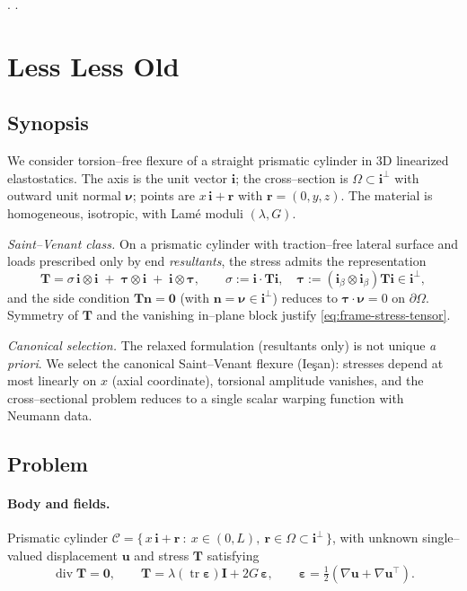 \cite{iesan1987saintvenants}.  \cite{synge1945problem}. 



\section{Less Less Old}

\subsection*{Synopsis}

We consider torsion–free flexure of a straight prismatic cylinder in 3D linearized elastostatics. The axis is the unit vector $\mathbf{i}$; the cross–section is $\Omega\subset \mathbf{i}^\perp$ with outward unit normal $\bm{\nu}$; points are $x\,\mathbf{i}+\bm{r}$ with $\bm{r}=(0,y,z)$. 
The material is homogeneous, isotropic, with Lamé moduli $(\lambda,G)$.

\emph{Saint–Venant class.} On a prismatic cylinder with traction–free lateral surface and loads prescribed only by end \emph{resultants}, the stress admits the representation
\begin{equation}
\bm{T}=\sigma\,\mathbf{i}\otimes\mathbf{i}\;+\;\bm{\tau}\otimes\mathbf{i}\;+\;\mathbf{i}\otimes\bm{\tau},
\qquad
\sigma:=\mathbf{i}\cdot\bm{T}\mathbf{i},\quad
\bm{\tau}:=(\mathbf{i}_\beta\otimes \mathbf{i}_\beta)\bm{T}\mathbf{i}\in \mathbf{i}^\perp,
\label{eq:frame-stress-tensor}
\end{equation}
and the side condition $\bm{T}\bm{n}=\mathbf{0}$ (with $\bm{n}=\bm{\nu}\in\mathbf{i}^\perp$) reduces to $\bm{\tau}\cdot\bm{\nu}=0$ on $\partial\Omega$. Symmetry of $\bm{T}$ and the vanishing in–plane block justify \eqref{eq:frame-stress-tensor}.

\emph{Canonical selection.} The relaxed formulation (resultants only) is not unique \emph{a priori}. 
We select the canonical Saint–Venant flexure (Ieşan): stresses depend at most linearly on $x$ (axial coordinate), torsional amplitude vanishes, and the cross–sectional problem reduces to a single scalar warping function with Neumann data.

\subsection*{Problem}

\paragraph{Body and fields.}
Prismatic cylinder $\mathcal{C}=\{\,x\,\mathbf{i}+\bm{r}\ :\ x\in(0,L),\ \bm{r}\in\Omega\subset\mathbf{i}^\perp\,\}$, with unknown single–valued displacement $\bm{u}$ and stress $\bm{T}$ satisfying
\[
\operatorname{div}\bm{T}=\mathbf{0},\qquad
\bm{T}=\lambda(\operatorname{tr}\bm{\varepsilon})\mathbf{I}+2G\,\bm{\varepsilon},\qquad
\bm{\varepsilon}=\tfrac12(\nabla \bm{u}+\nabla \bm{u}^{\!\top}).
\]

